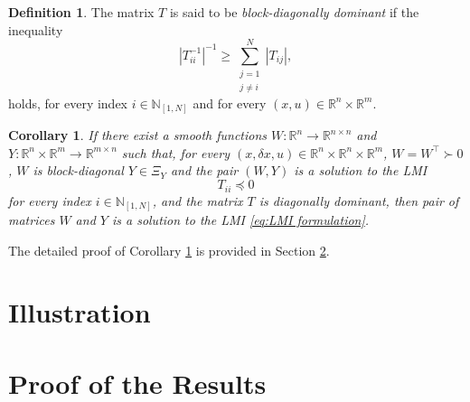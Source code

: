\documentclass[10pt,twocolumn,twoside]{IEEEtran}
\theoremstyle{plain}
\newtheorem{corollary}[theorem]{Corollary}
\theoremstyle{definition}
\newtheorem{definition}[theorem]{Definition}
\theoremstyle{remark}
\begin{document}
\begin{definition}\label{def:}
	The matrix $T$ is said to be \emph{block-diagonally dominant} if the inequality
	\begin{equation}\label{eq:BDD}
		|T_{ii}^{-1}|^{-1}\geq\sum_{\substack{j=1\\ j\neq i}}^N|T_{ij}|,
	\end{equation}
	holds, for every index $i\in\mathbb{N}_{[1,N]}$ and for every $(x,u)\in\mathbb{R}^n\times\mathbb{R}^m$.
\end{definition}

\begin{corollary}\label{cor:distributed computation}
	 If there exist a smooth functions $W:\mathbb{R}^n\to\mathbb{R}^{n\times n}$ and $Y:\mathbb{R}^n\times\mathbb{R}^m\to\mathbb{R}^{m\times n}$ such that, for every $(x,\delta x,u)\in\mathbb{R}^n\times\mathbb{R}^n\times\mathbb{R}^m$, $W=W^\top\succ0$, $W$ is block-diagonal $Y\in\Xi_Y$ and the pair $(W,Y)$ is a solution to the LMI
	\begin{equation}\label{eq:LMI formulation:i}
		T_{ii}\preceq 0
	\end{equation}
	for every index $i\in\mathbb{N}_{[1,N]}$, and the matrix $T$ is diagonally dominant, then pair of matrices $W$ and $Y$ is a solution to the LMI \eqref{eq:LMI formulation}.
\end{corollary}

The detailed proof of Corollary \ref{cor:distributed computation} is provided in Section \ref{sec:Proof of the Results}.


\section{Illustration}\label{sec:Illustration}


\section{Proof of the Results}\label{sec:Proof of the Results}
\end{document}

